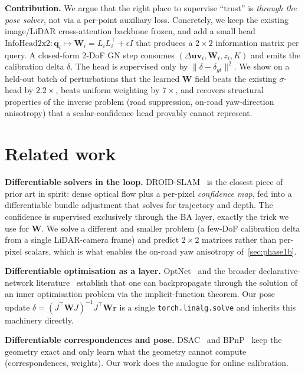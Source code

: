 \documentclass[10pt,conference,a4paper]{IEEEtran}
\newcommand{\Suv}{\Delta\mathbf{uv}}
\newcommand{\W}{\mathbf{W}}
\begin{document}
\textbf{Contribution.} We argue that the right place to supervise
``trust'' is \emph{through the pose solver}, not via a per-point
auxiliary loss. Concretely, we keep the existing image/LiDAR
cross-attention backbone frozen, and add a small head
$\mathrm{InfoHead2x2}: \mathbf{q}_i \mapsto \W_i = L_iL_i^\top + \epsilon I$
that produces a $2{\times}2$ information matrix per query. A
closed-form 2-DoF GN step consumes $(\Suv_i, \W_i, z_i, K)$ and emits
the calibration delta $\delta$. The head is supervised only by
$\|\delta - \delta_{gt}\|^2$. We show on a held-out batch of
perturbations that the learned $\W$ field beats the existing
$\sigma$-head by $2.2\times$, beats uniform weighting by $7\times$,
and recovers structural properties of the inverse problem (road
suppression, on-road yaw-direction anisotropy) that a scalar-confidence
head provably cannot represent.

\section{Related work}

\textbf{Differentiable solvers in the loop.}
DROID-SLAM~\cite{teed2021droid} is the closest piece of prior art in
spirit: dense optical flow plus a per-pixel \emph{confidence map}, fed
into a differentiable bundle adjustment that solves for trajectory and
depth. The confidence is supervised exclusively through the BA layer,
exactly the trick we use for $\W$. We solve a different and smaller
problem (a few-DoF calibration delta from a single LiDAR-camera
frame) and predict $2{\times}2$ matrices rather than per-pixel
scalars, which is what enables the on-road yaw anisotropy
of~\cref{sec:phase1b}.

\textbf{Differentiable optimisation as a layer.}
OptNet~\cite{amos2017optnet} and the broader declarative-network
literature~\cite{gould2021deep} establish that one can backpropagate
through the solution of an inner optimisation problem via the
implicit-function theorem. Our pose update
$\delta = (J^\top\W J)^{-1} J^\top\W \mathbf{r}$ is a single
\texttt{torch.linalg.solve} and inherits this machinery directly.

\textbf{Differentiable correspondences and pose.}
DSAC~\cite{brachmann2017dsac} and BPnP~\cite{chen2020bpnp} keep the
geometry exact and only learn what the geometry cannot compute
(correspondences, weights). Our work does the analogue for online
calibration.
\end{document}
